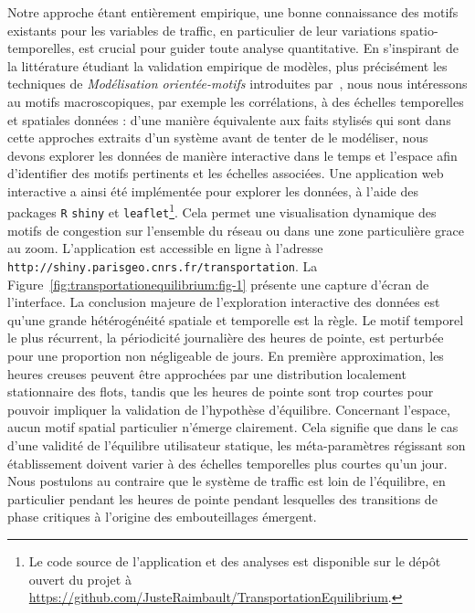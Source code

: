 {Notre approche étant entièrement empirique, une bonne connaissance des motifs existants pour les variables de traffic, en particulier de leur variations spatio-temporelles, est crucial pour guider toute analyse quantitative. En s'inspirant de la littérature étudiant la validation empirique de modèles, plus précisément les techniques de \emph{Modélisation orientée-motifs} introduites par~\cite{grimm2005pattern}, nous nous intéressons au motifs macroscopiques, par exemple les corrélations, à des échelles temporelles et spatiales données : d'une manière équivalente aux faits stylisés qui sont dans cette approches extraits d'un système avant de tenter de le modéliser, nous devons explorer les données de manière interactive dans le temps et l'espace afin d'identifier des motifs pertinents et les échelles associées. Une application web interactive a ainsi été implémentée pour explorer les données, à l'aide des packages \texttt{R} \texttt{shiny} et \texttt{leaflet}\footnote{Le code source de l'application et des analyses est disponible sur le dépôt ouvert du projet à \url{https://github.com/JusteRaimbault/TransportationEquilibrium}.}. Cela permet une visualisation dynamique des motifs de congestion sur l'ensemble du réseau ou dans une zone particulière grace au zoom. L'application est accessible en ligne à l'adresse \texttt{http://shiny.parisgeo.cnrs.fr/transportation}. La Figure~\ref{fig:transportationequilibrium:fig-1} présente une capture d'écran de l'interface. La conclusion majeure de l'exploration interactive des données est qu'une grande hétérogénéité spatiale et temporelle est la règle. Le motif temporel le plus récurrent, la périodicité journalière des heures de pointe, est perturbée pour une proportion non négligeable de jours. En première approximation, les heures creuses peuvent être approchées par une distribution localement stationnaire des flots, tandis que les heures de pointe sont trop courtes pour pouvoir impliquer la validation de l'hypothèse d'équilibre. Concernant l'espace, aucun motif spatial particulier n'émerge clairement. Cela signifie que dans le cas d'une validité de l'équilibre utilisateur statique, les méta-paramètres régissant son établissement doivent varier à des échelles temporelles plus courtes qu'un jour. Nous postulons au contraire que le système de traffic est loin de l'équilibre, en particulier pendant les heures de pointe pendant lesquelles des transitions de phase critiques à l'origine des embouteillages émergent.
}
 


